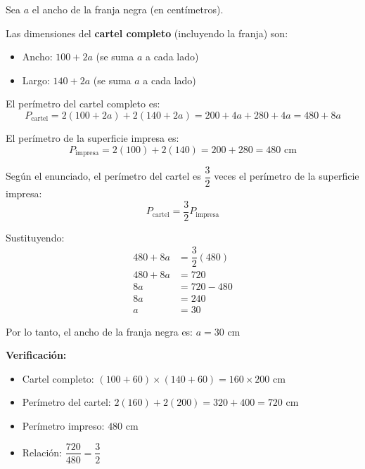 \documentclass[12pt]{article}
\begin{document}
\begin{enumerate}[label=\alph*.-]
\begin{center}
\end{center}

Sea $a$ el ancho de la franja negra (en centímetros).

Las dimensiones del \textbf{cartel completo} (incluyendo la franja) son:
\begin{itemize}
    \item Ancho: $100 + 2a$ (se suma $a$ a cada lado)
    \item Largo: $140 + 2a$ (se suma $a$ a cada lado)
\end{itemize}

El perímetro del cartel completo es:
\[
P_{\text{cartel}} = 2(100 + 2a) + 2(140 + 2a) = 200 + 4a + 280 + 4a = 480 + 8a
\]

El perímetro de la superficie impresa es:
\[
P_{\text{impresa}} = 2(100) + 2(140) = 200 + 280 = 480 \text{ cm}
\]

Según el enunciado, el perímetro del cartel es $\dfrac{3}{2}$ veces el perímetro de la superficie impresa:
\[
P_{\text{cartel}} = \dfrac{3}{2} P_{\text{impresa}}
\]

Sustituyendo:
\begin{align*}
480 + 8a &= \dfrac{3}{2}(480) \\[0.3em]
480 + 8a &= 720 \\[0.3em]
8a &= 720 - 480 \\[0.3em]
8a &= 240 \\[0.3em]
a &= 30
\end{align*}

Por lo tanto, el ancho de la franja negra es: $\boxed{a = 30 \text{ cm}}$

\textbf{Verificación:}
\begin{itemize}
    \item Cartel completo: $(100 + 60) \times (140 + 60) = 160 \times 200$ cm
    \item Perímetro del cartel: $2(160) + 2(200) = 320 + 400 = 720$ cm
    \item Perímetro impreso: $480$ cm
    \item Relación: $\dfrac{720}{480} = \dfrac{3}{2}$
\end{itemize}


\end{enumerate}
\end{document}
